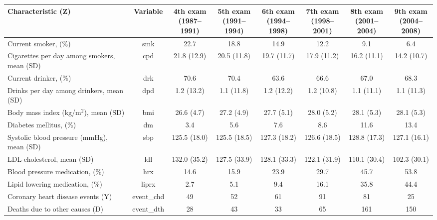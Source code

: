 \begin{table}[H]
\centering
\begin{tabular}{lccccccc}
\toprule
Characteristic (Z) & Variable & \shortstack{4th exam \\ (1987–1991)} & \shortstack{5th exam \\ (1991–1994)} & \shortstack{6th exam \\ (1994–1998)} & \shortstack{7th exam \\ (1998–2001)} & \shortstack{8th exam \\ (2001–2004)} & \shortstack{9th exam \\ (2004–2008)}\\
\midrule
Current smoker, (\%) & smk & 22.7 & 18.8 & 14.9 & 12.2 & 9.1 & 6.4\\
Cigarettes per day among smokers, mean (SD) & cpd & 21.8 (12.9) & 20.5 (11.8) & 19.7 (11.7) & 17.9 (11.2) & 16.2 (11.1) & 14.2 (10.7)\\
Current drinker, (\%) & drk & 70.6 & 70.4 & 63.6 & 66.6 & 67.0 & 68.3\\
Drinks per day among drinkers, mean (SD) & dpd & 1.2 (13.2) & 1.1 (11.8) & 1.2 (12.2) & 1.2 (10.8) & 1.1 (11.1) & 1.1 (11.3)\\
Body mass index (kg/m$^2$), mean (SD) & bmi & 26.6 (4.7) & 27.2 (4.9) & 27.7 (5.1) & 28.0 (5.2) & 28.1 (5.3) & 28.1 (5.3)\\
Diabetes mellitus, (\%) & dm & 3.4 & 5.6 & 7.6 & 8.6 & 11.6 & 13.4\\
Systolic blood pressure (mmHg), mean (SD) & sbp & 125.5 (18.0) & 125.5 (18.5) & 127.3 (18.2) & 126.6 (18.5) & 128.8 (17.3) & 127.1 (16.1)\\
LDL-cholesterol, mean (SD) & ldl & 132.0 (35.2) & 127.5 (33.9) & 128.1 (33.3) & 122.1 (31.9) & 110.1 (30.4) & 102.3 (30.1)\\
Blood pressure medication, (\%) & hrx & 14.6 & 15.9 & 23.9 & 29.7 & 45.7 & 53.8\\
Lipid lowering medication, (\%) & liprx & 2.7 & 5.1 & 9.4 & 16.1 & 35.8 & 44.4\\
\hline
Coronary heart disease events (Y) & event_chd & 49 & 52 & 61 & 91 & 81 & 25\\
Deaths due to other causes (D) & event_dth & 28 & 43 & 33 & 65 & 161 & 150\\
\bottomrule
\end{tabular}
\end{table}
